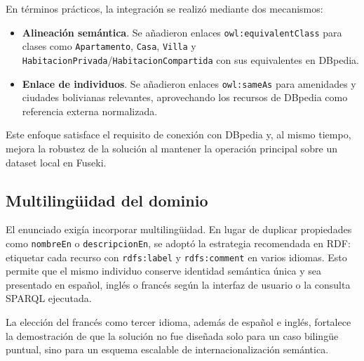 En términos prácticos, la integración se realizó mediante dos mecanismos:

\begin{itemize}
  \item \textbf{Alineación semántica}. Se añadieron enlaces
  \texttt{owl:equivalentClass} para clases como \texttt{Apartamento}, \texttt{Casa},
  \texttt{Villa} y \texttt{HabitacionPrivada}/\texttt{HabitacionCompartida} con sus
  equivalentes en DBpedia.

  \item \textbf{Enlace de individuos}. Se añadieron enlaces \texttt{owl:sameAs} para
  amenidades y ciudades bolivianas relevantes, aprovechando los recursos de DBpedia como
  referencia externa normalizada.
\end{itemize}

Este enfoque satisface el requisito de conexión con DBpedia y, al mismo tiempo, mejora
la robustez de la solución al mantener la operación principal sobre un dataset local en
Fuseki.

\subsection{Multilingüidad del dominio}

El enunciado exigía incorporar multilingüidad. En lugar de duplicar propiedades como
\texttt{nombreEn} o \texttt{descripcionEn}, se adoptó la estrategia recomendada en RDF:
etiquetar cada recurso con \texttt{rdfs:label} y \texttt{rdfs:comment} en varios
idiomas. Esto permite que el mismo individuo conserve identidad semántica única y sea
presentado en español, inglés o francés según la interfaz de usuario o la consulta
SPARQL ejecutada.

La elección del francés como tercer idioma, además de español e inglés, fortalece la
demostración de que la solución no fue diseñada solo para un caso bilingüe puntual, sino
para un esquema escalable de internacionalización semántica.
